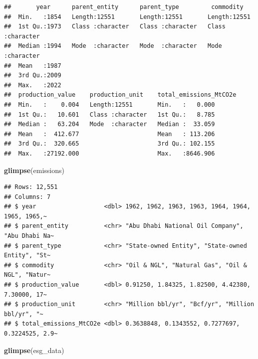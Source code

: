 \documentclass[
]{article}
\newenvironment{Shaded}{\begin{snugshade}}{\end{snugshade}}
\newcommand{\FunctionTok}[1]{\textcolor[rgb]{0.13,0.29,0.53}{\textbf{#1}}}
\newcommand{\NormalTok}[1]{#1}
\begin{document}
\begin{verbatim}
##       year      parent_entity      parent_type         commodity        
##  Min.   :1854   Length:12551       Length:12551       Length:12551      
##  1st Qu.:1973   Class :character   Class :character   Class :character  
##  Median :1994   Mode  :character   Mode  :character   Mode  :character  
##  Mean   :1987                                                           
##  3rd Qu.:2009                                                           
##  Max.   :2022                                                           
##  production_value    production_unit    total_emissions_MtCO2e
##  Min.   :    0.004   Length:12551       Min.   :   0.000      
##  1st Qu.:   10.601   Class :character   1st Qu.:   8.785      
##  Median :   63.204   Mode  :character   Median :  33.059      
##  Mean   :  412.677                      Mean   : 113.206      
##  3rd Qu.:  320.665                      3rd Qu.: 102.155      
##  Max.   :27192.000                      Max.   :8646.906
\end{verbatim}

\begin{Shaded}
\begin{Highlighting}[]
\FunctionTok{glimpse}\NormalTok{(emissions)}
\end{Highlighting}
\end{Shaded}

\begin{verbatim}
## Rows: 12,551
## Columns: 7
## $ year                   <dbl> 1962, 1962, 1963, 1963, 1964, 1964, 1965, 1965,~
## $ parent_entity          <chr> "Abu Dhabi National Oil Company", "Abu Dhabi Na~
## $ parent_type            <chr> "State-owned Entity", "State-owned Entity", "St~
## $ commodity              <chr> "Oil & NGL", "Natural Gas", "Oil & NGL", "Natur~
## $ production_value       <dbl> 0.91250, 1.84325, 1.82500, 4.42380, 7.30000, 17~
## $ production_unit        <chr> "Million bbl/yr", "Bcf/yr", "Million bbl/yr", "~
## $ total_emissions_MtCO2e <dbl> 0.3638848, 0.1343552, 0.7277697, 0.3224525, 2.9~
\end{verbatim}

\begin{Shaded}
\begin{Highlighting}[]
\FunctionTok{glimpse}\NormalTok{(esg\_data) }
\end{Highlighting}
\end{Shaded}
\end{document}
